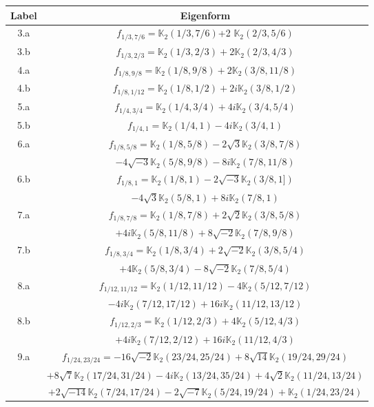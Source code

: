 \documentclass[12pt]{amsart}
\theoremstyle{definition}
\theoremstyle{remark}
\begin{document}
\begin{table}[ht]
\centering
    \begin{tabular}{c|c}
       Label  & Eigenform \\\hline 
        3.a & $f_{1/3,7/6}=\mathbb{K}_2(1/3,7/6)$+2 $\mathbb{K}_2(2/3,5/6)$ \\\hline
        3.b & $f_{1/3,2/3}=\mathbb{K}_2(1/3,2/3)+2\mathbb{K}_2(2/3,4/3)$\\\hline
         4.a  & $f_{1/8,9/8}=\mathbb{K}_2(1/8,9/8)+2\mathbb{K}_2(3/8,11/8)$\\\hline
        4.b  & $f_{1/8,1/12}=\mathbb{K}_2(1/8,1/2)+2i\mathbb{K}_2(3/8,1/2)$ \\\hline
         5.a    & $f_{1/4,3/4}=\mathbb{K}_2(1/4, 3/4) + 4 i\mathbb{K}_2(3/4, 5/4)$ \\\hline
          5.b    & $f_{1/4,1}=\mathbb{K}_2(1/4, 1) - 4 i\mathbb{K}_2(3/4, 1)$ \\\hline
         6.a  & $f_{1/8,5/8}=\mathbb{K}_2(1/8, 5/8) - 2 \sqrt{3} \mathbb{K}_2(3/8, 7/8) $\\&$- 4 \sqrt{-3} \mathbb{K}_2(5/8, 9/8) - 8 i \mathbb{K}_2(7/8, 11/8)$ \\\hline
        6.b & $f_{1/8,1}=\mathbb{K}_2(1/8, 1) - 2 \sqrt{-3} \mathbb{K}_2(3/8, 1])$\\&$- 4 \sqrt{3} \mathbb{K}_2(5/8, 1) + 8 i \mathbb{K}_2(7/8, 1)$ \\\hline
        7.a  & $f_{1/8,7/8}=\mathbb{K}_2(1/8, 7/8) + 2\sqrt{2} \mathbb{K}_2(3/8, 5/8) $\\&$+ 4i \mathbb{K}_2(5/8, 11/8) + 8\sqrt{-2} \mathbb{K}_2(7/8, 9/8)$ \\\hline
        7.b  & $f_{1/8,3/4}=\mathbb{K}_2(1/8, 3/4) + 2\sqrt{-2} \mathbb{K}_2(3/8, 5/4) $\\&$+ 4 \mathbb{K}_2(5/8, 3/4) - 8\sqrt{-2} \mathbb{K}_2(7/8, 5/4)$\\\hline
         8.a  & $f_{1/12,11/12}=\mathbb{K}_2(1/12, 11/12) - 4 \mathbb{K}_2(5/12, 7/12) $\\&$ - 4 i \mathbb{K}_2(7/12, 17/12)  + 
 16 i \mathbb{K}_2(11/12, 13/12)$ \\\hline
 8.b  & $f_{1/12,2/3}=\mathbb{K}_2(1/12, 2/3) + 4 \mathbb{K}_2(5/12, 4/3) $\\&$+ 4 i \mathbb{K}_2(7/12, 2/12) + 16 i \mathbb{K}_2(11/12, 4/3)$\\\hline
        9.a &  $f_{1/24,23/24}=-16 \sqrt{-2} \mathbb{K}_2(23/24, 25/24) + 8 \sqrt{14} \mathbb{K}_2(19/24, 29/24)$\\& $ +  8 \sqrt{7} \mathbb{K}_2(17/24, 31/24)  - 4 i \mathbb{K}_2(13/24, 35/24) + 4 \sqrt{2} \mathbb{K}_2(11/24, 13/24) $\\&$  + 2  \sqrt{-14} \mathbb{K}_2(7/24, 17/24)   - 2 \sqrt{-7} \mathbb{K}_2(5/24, 19/24) + \mathbb{K}_2(1/24, 23/24)$\\\hline

\end{tabular}
\end{table}
\end{document}
